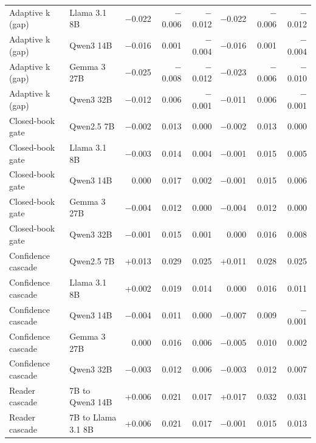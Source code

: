 \begin{table}[t]
\begin{tabular*}{\linewidth}{@{\extracolsep{\fill}}llrrrrrr}
Adaptive k (gap) & Llama 3.1 8B & $-$0.022 & $-$0.006 & $-$0.012 & $-$0.022 & $-$0.006 & $-$0.012 \\
Adaptive k (gap) & Qwen3 14B & $-$0.016 & 0.001 & $-$0.004 & $-$0.016 & 0.001 & $-$0.004 \\
Adaptive k (gap) & Gemma 3 27B & $-$0.025 & $-$0.008 & $-$0.012 & $-$0.023 & $-$0.006 & $-$0.010 \\
Adaptive k (gap) & Qwen3 32B & $-$0.012 & 0.006 & $-$0.001 & $-$0.011 & 0.006 & $-$0.001 \\
Closed-book gate & Qwen2.5 7B & $-$0.002 & 0.013 & 0.000 & $-$0.002 & 0.013 & 0.000 \\
Closed-book gate & Llama 3.1 8B & $-$0.003 & 0.014 & 0.004 & $-$0.001 & 0.015 & 0.005 \\
Closed-book gate & Qwen3 14B & 0.000 & 0.017 & 0.002 & $-$0.001 & 0.015 & 0.006 \\
Closed-book gate & Gemma 3 27B & $-$0.004 & 0.012 & 0.000 & $-$0.004 & 0.012 & 0.000 \\
Closed-book gate & Qwen3 32B & $-$0.001 & 0.015 & 0.001 & 0.000 & 0.016 & 0.008 \\
Confidence cascade & Qwen2.5 7B & +0.013 & 0.029 & 0.025 & +0.011 & 0.028 & 0.025 \\
Confidence cascade & Llama 3.1 8B & +0.002 & 0.019 & 0.014 & 0.000 & 0.016 & 0.011 \\
Confidence cascade & Qwen3 14B & $-$0.004 & 0.011 & 0.000 & $-$0.007 & 0.009 & $-$0.001 \\
Confidence cascade & Gemma 3 27B & 0.000 & 0.016 & 0.006 & $-$0.005 & 0.010 & 0.002 \\
Confidence cascade & Qwen3 32B & $-$0.003 & 0.012 & 0.006 & $-$0.003 & 0.012 & 0.007 \\
Reader cascade & 7B to Qwen3 14B & +0.006 & 0.021 & 0.017 & +0.017 & 0.032 & 0.031 \\
Reader cascade & 7B to Llama 3.1 8B & +0.006 & 0.021 & 0.017 & $-$0.001 & 0.015 & 0.013 \\
\bottomrule
\end{tabular*}
\end{table}

